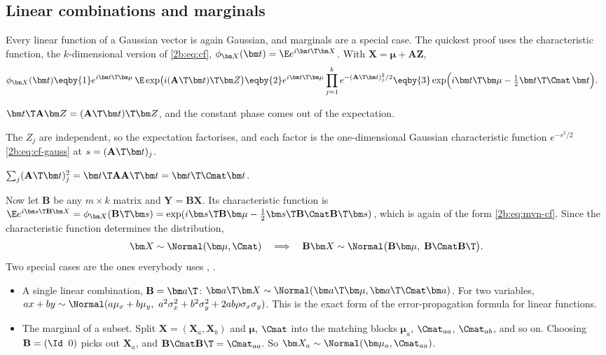 \subsection{Linear combinations and marginals}
\label{2b:sec:mvn-marginal}

Every linear function of a Gaussian vector is again Gaussian, and marginals are a special case. The quickest proof uses the characteristic function, the $k$-dimensional version of \eqref{2b:eq:cf}, $\phi_{\bm X}(\bm t)=\E e^{i\bm t\T\bm X}$. With $\bm X=\bm\mu+\mathbf A\bm Z$,
\begin{align}
  \phi_{\bm X}(\bm t)
  &\eqby{1} e^{i\bm t\T\bm\mu}\,\E\exp\bigl(i(\mathbf A\T\bm t)\T\bm Z\bigr)
   \eqby{2} e^{i\bm t\T\bm\mu}\prod_{j=1}^k e^{-(\mathbf A\T\bm t)_j^2/2}
   \eqby{3} \exp\Bigl(i\bm t\T\bm\mu-\tfrac12\bm t\T\Cmat\,\bm t\Bigr).
  \label{2b:eq:mvn-cf}
\end{align}
\begin{explain}
  \item $\bm t\T\mathbf A\bm Z=(\mathbf A\T\bm t)\T\bm Z$, and the constant phase comes out of the expectation.
  \item The $Z_j$ are independent, so the expectation factorises, and each factor is the one-dimensional Gaussian characteristic function $e^{-s^2/2}$ \eqref{2b:eq:cf-gauss} at $s=(\mathbf A\T\bm t)_j$.
  \item $\sum_j(\mathbf A\T\bm t)_j^2=\bm t\T\mathbf A\mathbf A\T\bm t=\bm t\T\Cmat\bm t$.
\end{explain}
Now let $\mathbf B$ be any $m\times k$ matrix and $\bm Y=\mathbf B\bm X$. Its characteristic function is $\E e^{i\bm s\T\mathbf B\bm X}=\phi_{\bm X}(\mathbf B\T\bm s)=\exp(i\bm s\T\mathbf B\bm\mu-\frac12\bm s\T\mathbf B\Cmat\mathbf B\T\bm s)$, which is again of the form \eqref{2b:eq:mvn-cf}. Since the characteristic function determines the distribution,
\begin{equation}
  \bm X\sim\Normal(\bm\mu,\Cmat)\quad\Longrightarrow\quad \mathbf B\bm X\sim\Normal\bigl(\mathbf B\bm\mu,\;\mathbf B\Cmat\mathbf B\T\bigr).
  \label{2b:eq:mvn-linear}
\end{equation}
Two special cases are the ones everybody uses , .
\begin{itemize}
  \item A single linear combination, $\mathbf B=\bm a\T$: $\bm a\T\bm X\sim\Normal(\bm a\T\bm\mu,\bm a\T\Cmat\bm a)$. For two variables, $ax+by\sim\Normal(a\mu_x+b\mu_y,\ a^2\sigma_x^2+b^2\sigma_y^2+2ab\rho\sigma_x\sigma_y)$. This is the exact form of the error-propagation formula for linear functions.
  \item The marginal of a subset. Split $\bm X=(\bm X_a,\bm X_b)$ and $\bm\mu$, $\Cmat$ into the matching blocks $\bm\mu_a$, $\Cmat_{aa}$, $\Cmat_{ab}$, and so on. Choosing $\mathbf B=(\Id\;\;0)$ picks out $\bm X_a$, and $\mathbf B\Cmat\mathbf B\T=\Cmat_{aa}$. So $\bm X_a\sim\Normal(\bm\mu_a,\Cmat_{aa})$.
\end{itemize}
